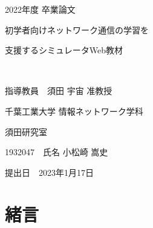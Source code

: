 \documentclass[12pt,a4j,titlepage]{ltjsarticle}
\begin{document}
\begin{titlepage}
  \begin{center}
  
    \vspace*{20truept}
    
    {\LARGE 2022年度 卒業論文}
    
    \vspace*{75truept}
    
    {\Huge 初学者向けネットワーク通信の学習を}　%

    \vspace{10truept}

    {\Huge 支援するシミュレータWeb教材 }　%

    \vspace{10truept}

    {\Huge }　%

    \vspace{85truept}
    
    {\LARGE 指導教員　須田 宇宙 准教授}
    
    \vspace{60truept}
    
    {\LARGE 千葉工業大学 情報ネットワーク学科}
    
    \vspace{15truept}
    
    {\LARGE 須田研究室}
    
    \vspace{70truept}
    
    {\LARGE 1932047　氏名 小松崎 嵩史 }　%

    \vspace{70truept}
    
  \end{center}
  \begin{flushright}

    {\LARGE 提出日　2023年1月17日}
  
  \end{flushright}
\end{titlepage}
\setcounter{page}{0}\pagestyle{plain}
\tableofcontents
\listoftables
\listoffigures

\clearpage
\setcounter{page}{0}
\section{緒言}%
\end{document}
